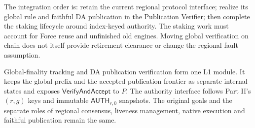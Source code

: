 \documentclass[11pt,a4paper]{article}
\newcommand{\api}[1]{\ensuremath{\mathsf{#1}}}
\begin{document}
The integration order is: retain the current regional protocol interface;
realize its global rule and faithful DA publication in the Publication
Verifier; then complete the staking
lifecycle around index-keyed authority. The staking work must account
for Force reuse and unfinished old engines. Moving global verification
on chain does not itself provide retirement clearance or change the
regional fault assumption.

Global-finality tracking and DA publication verification form one L1
module. It keeps the global prefix and the accepted publication frontier
as separate internal states and exposes \api{VerifyAndAccept} to $P$. The
authority interface follows Part II's $(r,g)$ keys and immutable
$\api{AUTH}_{r,0}$ snapshots. The original goals and the separate roles
of regional consensus, liveness management, native execution and faithful
publication remain the same.
\end{document}
